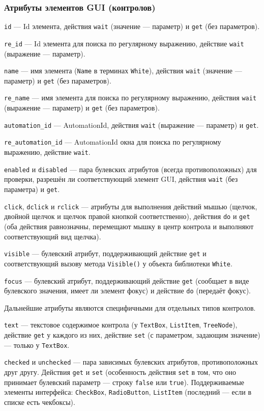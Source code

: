 \documentclass[11pt]{book} %
\begin{document}
\subsubsection{Атрибуты элементов GUI (контролов)}


\verb'id' --- Id элемента, действия \verb|wait| (значение --- параметр) и \verb|get| (без параметров).

\verb're_id' --- Id элемента для поиска по регулярному выражению, действие \verb|wait| (выражение --- параметр).

\verb'name' --- имя элемента (\verb|Name| в терминах \verb|White|), действия \verb|wait| (значение --- параметр) и \verb|get| (без параметров).

\verb're_name' --- имя элемента для поиска по регулярному выражению, действия \verb|wait| (выражение --- параметр) и \verb|get| (без параметров).

\verb'automation_id' --- AutomationId, действия \verb|wait| (выражение --- параметр) и \verb|get|.

\verb're_automation_id' --- AutomationId окна для поиска по регулярному выражению, действие \verb|wait|.

\verb'enabled' и \verb'disabled' --- пара булевских атрибутов (всегда противоположных) для проверки, разрешён ли соответствующий элемент GUI, действия \verb|wait| (без параметра) и \verb|get|.

\verb'click', \verb'dclick' и \verb|rclick| --- атрибуты для выполнения действий мышью (щелчок, двойной щелчок и щелчок правой кнопкой соответственно), действия \verb|do| и \verb|get| (оба действия равнозначны, перемещают мышку в центр контрола и выполняют соответствующий вид щелчка).

\verb|visible| --- булевский атрибут, поддерживающий действие \verb|get| и соответствующий вызову метода \verb|Visible()| у объекта библиотеки \verb|White|.

\verb|focus| --- булевский атрибут, поддерживающий действие \verb|get| (сообщает в виде булевского значения, имеет ли элемент фокус) и действие \verb|do| (передаёт фокус).

Дальнейшие атрибуты являются специфичными для отдельных типов контролов.

\verb|text| --- текстовое содержимое контрола (у \verb|TextBox|, \verb|ListItem|, \verb|TreeNode|), действие \verb|get| у каждого из них, действие \verb|set| (с параметром, задающим значение) --- только у \verb|TextBox|.


\verb|checked| и \verb|unchecked| --- пара зависимых булевских атрибутов, противоположных друг другу. Действия \verb|get| и \verb|set| (особенность действия \verb|set| в том, что оно принимает булевский параметр --- строку \verb|false| или \verb|true|). Поддерживаемые элементы интерфейса: \verb|CheckBox|, \verb|RadioButton|, \verb|ListItem| (последний --- если в списке есть чекбоксы).
\end{document}
